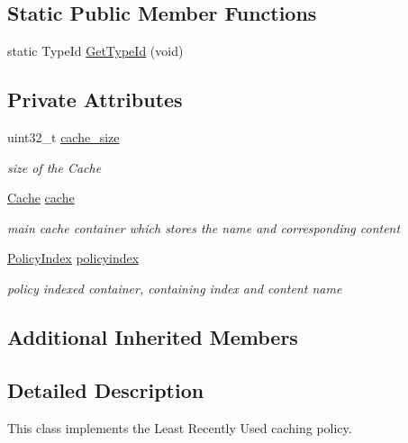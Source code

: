 \subsection*{Static Public Member Functions}
\begin{DoxyCompactItemize}
\item 
static Type\-Id \hyperlink{classns3_1_1CacheWithLRU_aa84deadfb0a84e5c63abe3a0f59c06d8}{Get\-Type\-Id} (void)
\end{DoxyCompactItemize}
\subsection*{Private Attributes}
\begin{DoxyCompactItemize}
\item 
uint32\-\_\-t \hyperlink{classns3_1_1CacheWithLRU_a9bd4ccdfb85587489ed2832695e0da62}{cache\-\_\-size}
\begin{DoxyCompactList}\small\item\em size of the Cache \end{DoxyCompactList}\item 
\hyperlink{classns3_1_1NamedContentCache_a9aa35d883b9f4153d97b6e7dc74f9307}{Cache} \hyperlink{classns3_1_1CacheWithLRU_ae7ffb4f0cbe5e8e6d769b71dc26d61d4}{cache}
\begin{DoxyCompactList}\small\item\em main cache container which stores the name and corresponding content \end{DoxyCompactList}\item 
\hyperlink{classns3_1_1NamedContentCache_a0b728ea2d4e0acbe431897b2374cfc8e}{Policy\-Index} \hyperlink{classns3_1_1CacheWithLRU_ada6a1db505251a0b7d96a18cf5cf0f1b}{policyindex}
\begin{DoxyCompactList}\small\item\em policy indexed container, containing index and content name \end{DoxyCompactList}\end{DoxyCompactItemize}
\subsection*{Additional Inherited Members}


\subsection{Detailed Description}
This class implements the Least Recently Used caching policy. 


